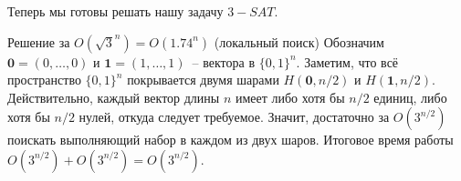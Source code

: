 Теперь мы готовы решать нашу задачу $3-SAT$.

\begin{algodescription}{Решение за $O\left(\sqrt{3}^n\right) = O(1.74^n)$ (локальный поиск)}
Обозначим $\mathbf 0 = (0, \ldots, 0)$ и $\mathbf 1 = (1, \ldots, 1)$~-- вектора в $\{0, 1\}^n$. Заметим, что всё пространство $\{0, 1\}^n$ покрывается двумя шарами $H(\mathbf 0, n/2)$ и $H(\mathbf 1, n/2)$. Действительно, каждый вектор длины $n$ имеет либо хотя бы $n/2$ единиц, либо хотя бы $n/2$ нулей, откуда следует требуемое. Значит, достаточно за $O(3^{n/2})$ поискать выполняющий набор в каждом из двух шаров. Итоговое время работы $O(3^{n/2}) + O(3^{n/2}) = O(3^{n/2})$.    
\end{algodescription}

